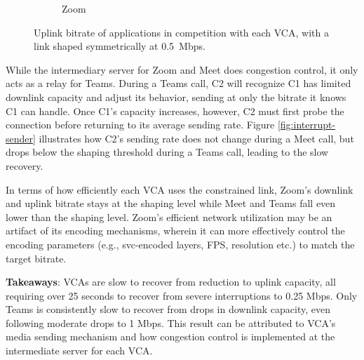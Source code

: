 \begin{figure}[t!]
\begin{subfigure}[t]{.33\textwidth}
        \caption{Zoom}
        \label{fig:zoom_ul_box}
    \end{subfigure}
    \caption{Uplink bitrate of applications in competition with each VCA, with a link shaped symmetrically at 0.5~Mbps.}
    \label{fig:boxplot-upld}
\end{figure}




While the intermediary server for Zoom and Meet does congestion control, it only acts as a relay for Teams. During a Teams call, C2 will recognize C1 has limited downlink capacity and adjust its behavior, sending at only the bitrate it knows C1 can handle. Once C1's capacity increases, however, C2 must first probe the connection before returning to its average sending rate. Figure \ref{fig:interrupt-sender} illustrates how C2's sending rate does not change during a Meet call, but drops below the shaping threshold during a Teams call, leading to the slow recovery.


In terms of how efficiently each VCA uses the constrained link, Zoom's downlink and uplink bitrate stays at the shaping level while Meet and Teams fall even lower than the shaping level. Zoom's efficient network utilization may be an artifact of its encoding mechanisms, wherein it can more effectively control the encoding parameters (e.g., svc-encoded layers, FPS, resolution etc.) to match the target bitrate.  

\begin{mdframed}[roundcorner=5pt, backgroundcolor=black!10]
\noindent \textbf{Takeaways}: VCAs are slow to recover from reduction to uplink capacity, all requiring over 25 seconds to recover from severe interruptions to 0.25 Mbps. Only Teams is consistently slow to recover from drops in downlink capacity, even following moderate drops to 1 Mbps. This result can be attributed to VCA's media sending mechanism and how  congestion control is implemented at the intermediate server for each VCA. 
\end{mdframed}


